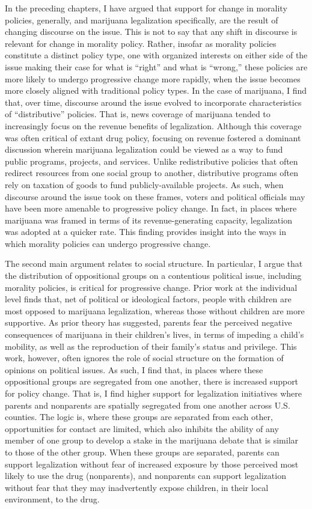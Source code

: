 In the preceding chapters, I have argued that support for change in morality policies, generally, and marijuana legalization specifically, are the result of changing discourse on the issue. This is not to say that any shift in discourse is relevant for change in morality policy. Rather, insofar as morality policies constitute a distinct policy type, one with organized interests on either side of the issue making their case for what is ``right'' and what is ``wrong,'' these policies are more likely to undergo progressive change more rapidly, when the issue becomes more closely aligned with traditional policy types. In the case of marijuana, I find that, over time, discourse around the issue evolved to incorporate characteristics of ``distributive'' policies. That is, news coverage of marijuana tended to increasingly focus on the revenue benefits of legalization. Although this coverage was often critical of extant drug policy, focusing on revenue fostered a dominant discussion wherein marijuana legalization could be viewed as a way to fund public programs, projects, and services. Unlike redistributive policies that often redirect resources from one social group to another, distributive programs often rely on taxation of goods to fund publicly-available projects. As such, when discourse around the issue took on these frames, voters and political officials may have been more amenable to progressive policy change. In fact, in places where marijuana was framed in terms of its revenue-generating capacity, legalization was adopted at a quicker rate. This finding provides insight into the ways in which morality policies can undergo progressive change. 

The second main argument relates to social structure. In particular, I argue that the distribution of oppositional groups on a contentious political issue, including morality policies, is critical for progressive change. Prior work at the individual level finds that, net of political or ideological factors, people with children are most opposed to marijuana legalization, whereas those without children are more supportive. As prior theory has suggested, parents fear the perceived negative consequences of marijuana in their children's lives, in terms of impeding a child's mobility, as well as the reproduction of their family's status and privilege. This work, however, often ignores the role of social structure on the formation of opinions on political issues. As such, I find that, in places where these oppositional groups are segregated from one another, there is increased support for policy change. That is, I find higher support for legalization initiatives where parents and nonparents are spatially segregated from one another across U.S. counties. The logic is, where these groups are separated from each other, opportunities for contact are limited, which also inhibits the ability of any member of one group to develop a stake in the marijuana debate that is similar to those of the other group. When these groups are separated, parents can support legalization without fear of increased exposure by those perceived most likely to use the drug (nonparents), and nonparents can support legalization without fear that they may inadvertently expose children, in their local environment, to the drug. 


